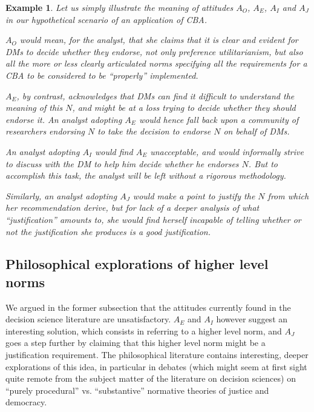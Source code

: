 \documentclass[preprint, french, english, 11pt, authoryear]{elsarticle}%
\newcommand{\ac}[1]{#1}
\newcommand{\acp}[1]{#1s}
\newtheorem{example}{Example}
\begin{document}
\begin{example}
Let us simply illustrate the meaning of attitudes $A_O$, $A_E$, $A_I$ and $A_J$ in our hypothetical scenario of an application of \ac{CBA}.

$A_O$ would mean, for the analyst, that she claims that it is clear and evident for \acp{DM} to decide whether they endorse, not only preference utilitarianism, but also all the more or less clearly articulated norms specifying all the requirements for a \ac{CBA} to be considered to be ``properly'' implemented.

$A_E$, by contrast, acknowledges that \acp{DM} can find it difficult to understand the meaning of this $N$, and might be at a loss trying to decide whether they should endorse it. 
An analyst adopting $A_E$ would hence fall back upon a community of researchers endorsing $N$ to take the decision to endorse $N$ on behalf of \acp{DM}.

An analyst adopting $A_I$ would find $A_E$ unacceptable, and would informally strive to discuss with the \ac{DM} to help him decide whether he endorses $N$. But to accomplish this task, the analyst will be left without a rigorous methodology.
\begin{changebar}
Similarly, an analyst adopting $A_J$ would make a point to justify the $N$ from which her recommendation derive, but for lack of a deeper analysis of what ``justification'' amounts to, she would find herself incapable of telling whether or not the justification she produces is a good justification.
\end{changebar}
\end{example}

\subsection{Philosophical explorations of higher level norms}
\label{sec:higher}
We argued in the former subsection that the attitudes currently found in the decision science literature are unsatisfactory. 
$A_E$ and $A_I$ however suggest an interesting solution, which consists in referring to a higher level norm, and $A_J$ goes a step further by claiming that this higher level norm might be a justification requirement. 
The philosophical literature contains interesting, deeper explorations of this idea, in particular in debates (which might seem at first sight quite remote from the subject matter of the literature on decision sciences) on “purely procedural” vs. “substantive” normative theories of justice and democracy.
\end{document}
